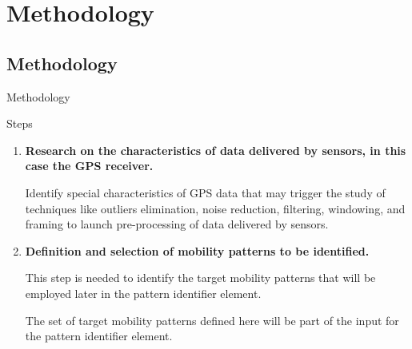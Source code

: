 \section{Methodology}
\subsection{Methodology}
\begin{frame}{Methodology}
  \small
  \begin{block}{Steps}
    \begin{enumerate}%
      \item \textbf{Research on the characteristics of data delivered by sensors, in this case the GPS receiver.}

        Identify special characteristics of GPS data that may trigger the study of techniques like outliers elimination, noise reduction, filtering, windowing, and framing to launch pre-processing of data delivered by sensors.


      \item \label{itm:def-sel-mob-pttrns} \textbf{Definition and selection of mobility patterns to be identified.}

        This step is needed to identify the target mobility patterns that will be employed later in the pattern identifier element.


        The set of target mobility patterns defined here will be part of the input for the pattern identifier element.

    \end{enumerate}
  \end{block}
\end{frame}

